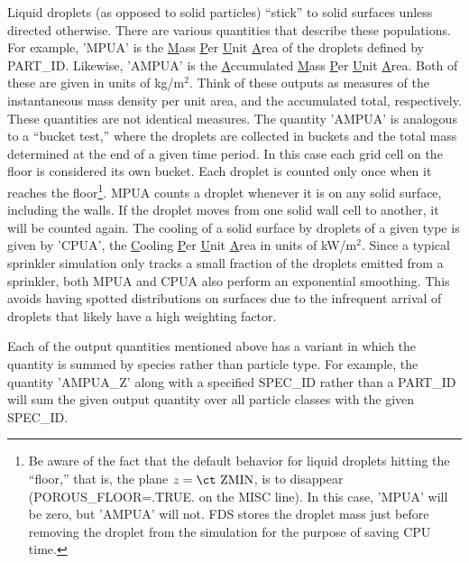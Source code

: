\documentclass[11pt]{book}
\begin{document}
Liquid droplets (as opposed to solid particles) ``stick'' to solid surfaces unless directed otherwise. There are various quantities that describe these populations. For example, {\ct 'MPUA'} is the \underline{M}ass \underline{P}er \underline{U}nit \underline{A}rea of the droplets defined by {\ct PART\_ID}. Likewise, {\ct 'AMPUA'} is the \underline{A}ccumulated \underline{M}ass \underline{P}er \underline{U}nit \underline{A}rea. Both of these are given in units of kg/m$^2$. Think of these outputs as measures of the instantaneous mass density per unit area, and the accumulated total, respectively. These quantities are not identical measures.  The quantity {\ct 'AMPUA'} is analogous to a ``bucket test,'' where the droplets are collected in buckets and the total mass determined at the end of a given time period. In this case each grid cell on the floor is considered its own bucket.  Each droplet is counted only once when it reaches the floor\footnote{Be aware of the fact that the default behavior for liquid droplets hitting the ``floor,'' that is, the plane $z=\hbox{\ct ZMIN}$, is to disappear ({\ct POROUS\_FLOOR=.TRUE.} on the {\ct MISC} line). In this case, {\ct 'MPUA'} will be zero, but {\ct 'AMPUA'} will not. FDS stores the droplet mass just before removing the droplet from the simulation for the purpose of saving CPU time.}. {\ct MPUA} counts a droplet whenever it is on any solid surface, including the walls. If the droplet moves from one solid wall cell to another, it will be counted again. The cooling of a solid surface by droplets of a given type is given by {\ct 'CPUA'}, the \underline{C}ooling \underline{P}er \underline{U}nit \underline{A}rea in units of kW/m$^2$. Since a typical sprinkler simulation only tracks a small fraction of the droplets emitted from a sprinkler, both {\ct MPUA} and {\ct CPUA} also perform an exponential smoothing. This avoids having spotted distributions on surfaces due to the infrequent arrival of droplets that likely have a high weighting factor.

Each of the output quantities mentioned above has a variant in which the quantity is summed by species rather than particle type. For example, the quantity {\ct 'AMPUA\_Z'} along with a specified {\ct SPEC\_ID} rather than a {\ct PART\_ID} will sum the given output quantity over all particle classes with the given {\ct SPEC\_ID}.
\end{document}
